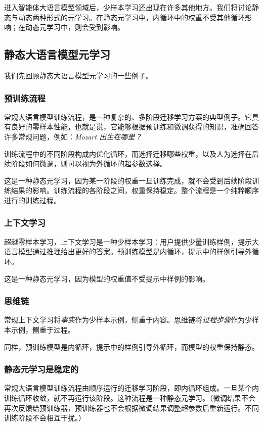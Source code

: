 进入智能体大语言模型领域后，少样本学习还出现在许多其他地方。我们将讨论静态与动态两种形式的元学习。在静态元学习中，内循环中的权重不受其他循环影响；在动态元学习中，则会受到影响。

\subsection{静态大语言模型元学习}
我们先回顾静态大语言模型元学习的一些例子。

\subsubsection{预训练流程}
常规大语言模型训练流程，是一种复杂的、多阶段迁移学习方案的典型例子。它具有良好的零样本性能，也就是说，它能够根据预训练和微调获得的知识，准确回答许多常规问题，例如：{\em Mozart 出生在哪里？}

训练流程中的不同阶段构成内优化循环，而选择迁移哪些权重，以及人为选择在后续阶段如何微调，则可以视为外循环的超参数选择。

这是一种静态元学习，因为某一阶段的权重一旦训练完成，就不会受到后续阶段训练结果的影响。训练流程的各阶段之间，权重保持稳定。整个流程是一个纯粹顺序进行的训练过程。

\subsubsection{上下文学习}
超越零样本学习，上下文学习是一种少样本学习：用户提供少量训练样例，提示大语言模型通过推理给出更好的答案。预训练模型是内循环，提示中的样例引导外循环。

这是一种静态元学习，因为模型的权重值不受提示中样例的影响。

\subsubsection{思维链}
常规上下文学习将{\em 事实}作为少样本示例，侧重于内容。思维链将{\em 过程步骤}作为少样本示例，侧重于过程。

同样，预训练模型是内循环，提示中的样例引导外循环，而模型的权重保持静态。

\subsubsection{静态元学习是稳定的}
常规大语言模型训练流程由顺序运行的迁移学习阶段，即内循环组成。一旦某个内训练循环收敛，就不再运行该阶段。这种流程是一种静态元学习。（微调结果不会再次反馈给预训练器，预训练器也不会根据微调结果调整超参数后重新运行。不同训练阶段不会相互干扰。）

